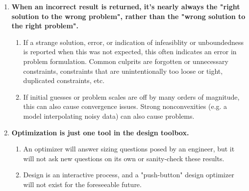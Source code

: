 \begin{enumerate}
\begin{enumerate}
        \item An optimizer only solves the problem that you give it. (And this is in the best case!) Often, it is easy to forget constraints that seem intuitively obvious.
        \item If any flaw exists in a physics model, the optimizer will exploit it. Models should extrapolate sensibly and generally be parsimonious. On objective functions, adding quadratic regularization is an effective last resort.
        \item Without special care, optimized designs are almost always fragile. An optimizer will tend to naturally drive to the edge of the feasible space. However, in nature\footnote{Mother Nature being arguably the most successful optimizer}, optima are usually not near extremes.
    \end{enumerate}
    \item \textbf{When an incorrect result is returned, it's nearly always the "right solution to the wrong problem", rather than the "wrong solution to the right problem".}
    \begin{enumerate}
        \item If a strange solution, error, or indication of infeasiblity or unboundedness is reported when this was not expected, this often indicates an error in problem formulation. Common culprits are forgotten or unnecessary constraints, constraints that are unintentionally too loose or tight, duplicated constraints, etc.
        \item If initial guesses or problem scales are off by many orders of magnitude, this can also cause convergence issues. Strong nonconvexities (e.g. a model interpolating noisy data) can also cause problems.
    \end{enumerate}
    \item \textbf{Optimization is just one tool in the design toolbox.}
    \begin{enumerate}
        \item An optimizer will answer sizing questions posed by an engineer, but it will not ask new questions on its own or sanity-check these results.
        \item Design is an interactive process, and a "push-button" design optimizer will not exist for the foreseeable future.
    \end{enumerate}
\end{enumerate}
